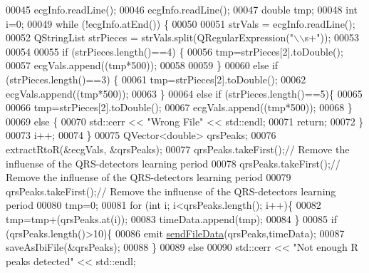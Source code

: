 \begin{DoxyCode}
00045             ecgInfo.readLine();
00046             ecgInfo.readLine();
00047             \textcolor{keywordtype}{double} tmp;
00048             \textcolor{keywordtype}{int} i=0;
00049             \textcolor{keywordflow}{while} (!ecgInfo.atEnd()) \{
00050 
00051                 strVals = ecgInfo.readLine();
00052                 QStringList strPieces = strVals.split(QRegularExpression(\textcolor{stringliteral}{"\(\backslash\)\(\backslash\)s+"}));
00053 
00054 
00055                 \textcolor{keywordflow}{if} (strPieces.length()==4) \{
00056                     tmp=strPieces[2].toDouble();
00057                     ecgVals.append((tmp*500)); 
00058 
00059                 \}
00060                 \textcolor{keywordflow}{else} \textcolor{keywordflow}{if} (strPieces.length()==3) \{
00061                                     tmp=strPieces[2].toDouble();
00062                                     ecgVals.append((tmp*500));
00063                                                     \}
00064                 \textcolor{keywordflow}{else} \textcolor{keywordflow}{if} (strPieces.length()==5)\{
00065 
00066                     tmp=strPieces[2].toDouble();
00067                     ecgVals.append((tmp*500));
00068                     \}
00069                 \textcolor{keywordflow}{else} \{
00070                     std::cerr << \textcolor{stringliteral}{"Wrong File"} << std::endl;
00071                     \textcolor{keywordflow}{return};
00072                 \}
00073                 i++;
00074                 \}
00075             QVector<double> qrsPeaks;
00076             extractRtoR(&ecgVals, &qrsPeaks);
00077             qrsPeaks.takeFirst();\textcolor{comment}{// Remove the influense of the QRS-detectors learning period}
00078             qrsPeaks.takeFirst();\textcolor{comment}{// Remove the influense of the QRS-detectors learning period}
00079             qrsPeaks.takeFirst();\textcolor{comment}{// Remove the influense of the QRS-detectors learning period}
00080             tmp=0;
00081             \textcolor{keywordflow}{for} (\textcolor{keywordtype}{int} i; i<qrsPeaks.length(); i++)\{
00082                 tmp=tmp+(qrsPeaks.at(i));
00083                 timeData.append(tmp);
00084             \}
00085             \textcolor{keywordflow}{if} (qrsPeaks.length()>10)\{   
00086                 emit \hyperlink{classConvertEcgToIbi_a34d6d61a81e88116c65a2ba9198b7f1c}{sendFileData}(qrsPeaks,timeData);
00087                 saveAsIbiFile(&qrsPeaks);
00088             \}
00089             \textcolor{keywordflow}{else}
00090                 std::cerr << \textcolor{stringliteral}{"Not enough R peaks detected"} << std::endl;

\end{DoxyCode}
